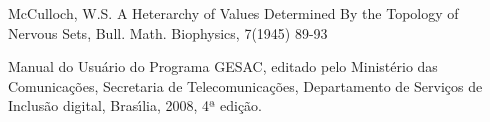 \documentclass[
12pt,		%
openright,	%
twoside,  %
a4paper,			%
chapter=TITLE,		%
english,			%
french,				%
spanish,			%
brazil				%
]{USPSC-classe/USPSC}
\begin{document}
\begin{flushleft}
\begin{flushleft}
\begin{flushleft}
\begin{flushleft}
\begin{flushleft}
\begin{flushleft}
\begin{flushleft}
\begin{flushleft}
\begin{flushleft}
[McCULLOCH, 1945] McCulloch, W.S. A Heterarchy of Values Determined By the Topology of Nervous Sets, Bull. Math. Biophysics, 7(1945) 89-93
\end{flushleft}


\end{flushleft}


\end{flushleft}


\end{flushleft}


\end{flushleft}


\end{flushleft}


\end{flushleft}


\end{flushleft}


\end{flushleft}


\begin{flushleft}
\begin{flushleft}
\begin{flushleft}
\begin{flushleft}
\begin{flushleft}
\begin{flushleft}
\begin{flushleft}
\begin{flushleft}
\begin{flushleft}
[MC, 2008] Manual do Usu\'ario do Programa GESAC, editado pelo Minist\'erio das Comunica\c{c}\~oes, Secretaria de Telecomunica\c{c}\~oes, Departamento de Servi\c{c}os de Inclus\~ao digital,  Bras\'{\i}lia, 2008, 4ª edi\c{c}\~ao.
\end{flushleft}


\end{flushleft}


\end{flushleft}


\end{flushleft}


\end{flushleft}


\end{flushleft}


\end{flushleft}


\end{flushleft}


\end{flushleft}
\end{document}
